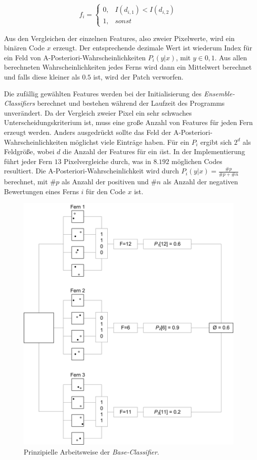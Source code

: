 $$
f_{i}=\begin{cases}
0, & I(d_{i,1})<I(d_{i,2})\\
1, & sonst
\end{cases}$$

Aus den Vergleichen der einzelnen Features, also zweier Pixelwerte, wird ein binären Code $x$ erzeugt. Der entsprechende dezimale Wert ist wiederum Index für ein Feld von A-Posteriori-Wahrscheinlichkeiten $P_{i}(y|x)$, mit $y\in{0,1}$. Aus allen berechneten Wahrscheinlichkeiten jedes Ferns wird dann ein Mittelwert berechnet und falls diese kleiner als $0.5$ ist, wird der Patch verworfen.

Die zufällig gewählten Features werden bei der Initialisierung des \textit{Ensemble-Classifiers} berechnet und bestehen während der Laufzeit des Programms unverändert. Da der Vergleich zweier Pixel ein sehr schwaches Unterscheidungskriterium ist, muss eine große Anzahl von Features für jeden Fern erzeugt werden. Anders ausgedrückt sollte das Feld der A-Posteriori-Wahrscheinlichkeiten möglichst viele Einträge haben. Für ein $P_{i}$ ergibt sich $2^{d}$ als Feldgröße, wobei $d$ die Anzahl der Features für ein $i$ist. In der Implementierung führt jeder Fern $13$ Pixelvergleiche durch, was in $8.192$ möglichen Codes resultiert. Die A-Posteriori-Wahrscheinlichkeit wird durch $P_{i}(y|x)=\frac{\#p}{\#p+\#n}$ berechnet, mit $\#p$ als Anzahl der positiven und $\#n$ als Anzahl der negativen Bewertungen eines Ferns $i$ für den Code $x$ ist.

\begin{figure}[H]
\begin{centering}
\includegraphics[scale=0.5]{../pictures/EnsembleBeispiel.jpg}
\par\end{centering}
\caption{Prinzipielle Arbeitsweise der \textit{Base-Classifier}.}
\label{EnCl}
\end{figure}

